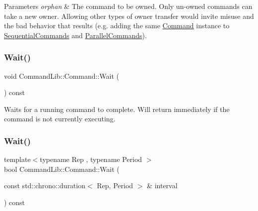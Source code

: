 \begin{DoxyParams}{Parameters}
{\em orphan} & The command to be owned. Only un-\/owned commands can take a new owner. Allowing other types of owner transfer would invite misuse and the bad behavior that results (e.\+g. adding the same \mbox{\hyperlink{class_command_lib_1_1_command}{Command}} instance to \mbox{\hyperlink{class_command_lib_1_1_sequential_commands}{Sequential\+Commands}} and \mbox{\hyperlink{class_command_lib_1_1_parallel_commands}{Parallel\+Commands}}). \\
\hline
\end{DoxyParams}
\mbox{\label{class_command_lib_1_1_command_ac4d49fbf9bbcc543fb57e4b04edf1ddb}} 
\subsubsection{\texorpdfstring{Wait()}{Wait()}\hspace{0.1cm}{\footnotesize\ttfamily [1/3]}}
{\footnotesize\ttfamily void Command\+Lib\+::\+Command\+::\+Wait (\begin{DoxyParamCaption}{ }\end{DoxyParamCaption}) const}



Waits for a running command to complete. Will return immediately if the command is not currently executing. 

\mbox{\label{class_command_lib_1_1_command_a0cd3c0e7ee280652c69a3e13a30b99e7}} 
\subsubsection{\texorpdfstring{Wait()}{Wait()}\hspace{0.1cm}{\footnotesize\ttfamily [2/3]}}
{\footnotesize\ttfamily template$<$typename Rep , typename Period $>$ \\
bool Command\+Lib\+::\+Command\+::\+Wait (\begin{DoxyParamCaption}\item[{const std\+::chrono\+::duration$<$ Rep, Period $>$ \&}]{interval }\end{DoxyParamCaption}) const\hspace{0.3cm}{\ttfamily [inline]}}



